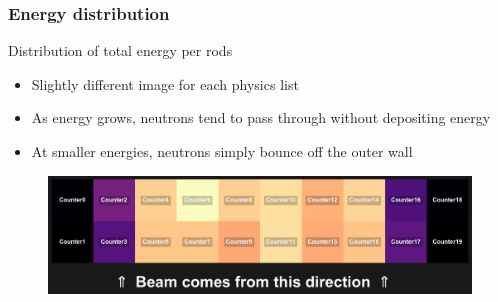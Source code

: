 \begin{frame}
\frametitle{Energy distribution}

\begin{block}{Distribution of total energy per rods}
	\begin{itemize}
		\item Slightly different image for each physics list
		\item As energy grows, neutrons tend to pass through without depositing energy
		\item At smaller energies, neutrons simply bounce off the outer wall
	\end{itemize}
\end{block}

\begin{figure}
	\includegraphics[width=\textwidth]{images/rod_heatmap_E120_phQGSP_INCLXX_HP.pdf}
\end{figure}

\end{frame}